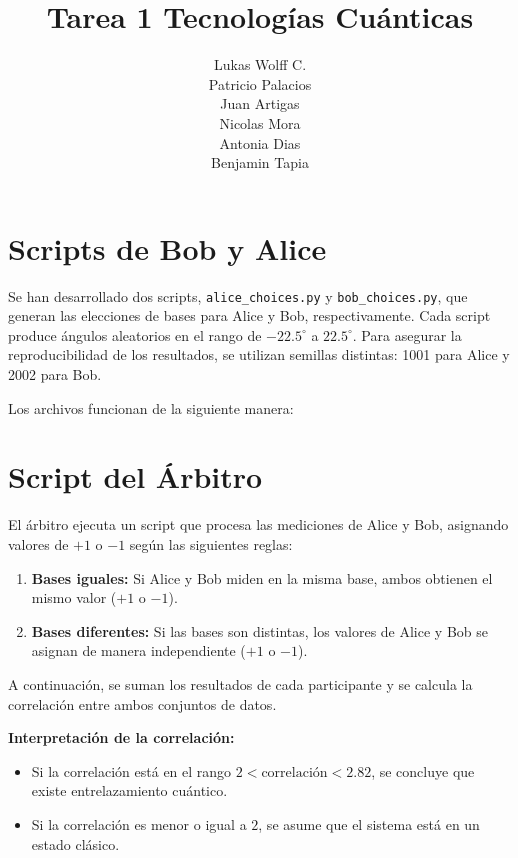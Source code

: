 \documentclass[11pt]{article}
\title{Tarea 1 Tecnologías Cuánticas}
\author{Lukas Wolff C.\\
        Patricio Palacios\\
        Juan Artigas\\
        Nicolas Mora\\
        Antonia Dias\\
        Benjamin Tapia}
\date{}
\begin{document}
\maketitle

\section{Scripts de Bob y Alice}

Se han desarrollado dos scripts, \texttt{alice\_choices.py} y \texttt{bob\_choices.py}, que generan las elecciones de bases para Alice y Bob, respectivamente. Cada script produce ángulos aleatorios en el rango de $-22.5^\circ$ a $22.5^\circ$. Para asegurar la reproducibilidad de los resultados, se utilizan semillas distintas: 1001 para Alice y 2002 para Bob.

Los archivos funcionan de la siguiente manera:

\section{Script del Árbitro}

El árbitro ejecuta un script que procesa las mediciones de Alice y Bob, asignando valores de $+1$ o $-1$ según las siguientes reglas:

\begin{enumerate}
    \item \textbf{Bases iguales:} Si Alice y Bob miden en la misma base, ambos obtienen el mismo valor ($+1$ o $-1$).
    \item \textbf{Bases diferentes:} Si las bases son distintas, los valores de Alice y Bob se asignan de manera independiente ($+1$ o $-1$).
\end{enumerate}

A continuación, se suman los resultados de cada participante y se calcula la correlación entre ambos conjuntos de datos.

\textbf{Interpretación de la correlación:}
\begin{itemize}
    \item Si la correlación está en el rango $2 < \text{correlación} < 2.82$, se concluye que existe entrelazamiento cuántico.
    \item Si la correlación es menor o igual a $2$, se asume que el sistema está en un estado clásico.
\end{itemize}
\end{document}
